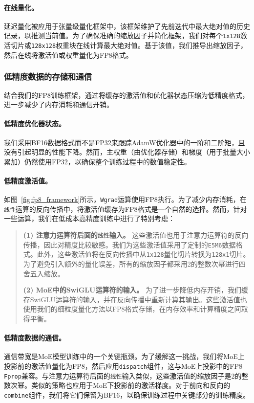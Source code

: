 \documentclass[lang=cn,a4paper,newtx]{elegantpaper}
\begin{document}
\paragraph{在线量化。}
延迟量化被应用于张量级量化框架中，该框架维护了先前迭代中最大绝对值的历史记录，以推测当前值。为了确保准确的缩放因子并简化框架，我们对每个\texttt{1x128}激活切片或\texttt{128x128}权重块在线计算最大绝对值。基于该值，我们推导出缩放因子，然后在线将激活值或权重量化为FP8格式。

\subsubsection{低精度数据的存储和通信}

结合我们的FP8训练框架，通过将缓存的激活值和优化器状态压缩为低精度格式，进一步减少了内存消耗和通信开销。

\paragraph{低精度优化器状态。}
我们采用BF16数据格式而不是FP32来跟踪AdamW优化器中的一阶和二阶矩，且没有引起明显的性能下降。然而，主权重（由优化器存储）和梯度（用于批量大小累加）仍然使用FP32，以确保整个训练过程中的数值稳定性。

\paragraph{低精度激活值。}
如图~\ref{fig:fp8_framework}所示，\texttt{Wgrad}运算使用FP8执行。为了减少内存消耗，在\texttt{线性}运算的反向传播中，将激活值缓存为FP8格式是一个自然的选择。然而，针对一些运算，我们在低成本高精度训练中进行了特别考虑：

\begin{quote}
\textbf{(1) 注意力运算符后面的\texttt{线性}输入。} 这些激活值也用于注意力运算符的反向传播，因此对精度比较敏感。我们为这些激活值采用了定制的\texttt{E5M6}数据格式。此外，这些激活值将在反向传播中从\texttt{1x128}量化切片转换为\texttt{128x1}切片。为了避免引入额外的量化误差，所有的缩放因子都采用2的整数次幂进行四舍五入缩放。

\textbf{(2) MoE中的SwiGLU运算符的输入。} 为了进一步降低内存开销，我们缓存SwiGLU运算符的输入，并在反向传播中重新计算其输出。这些激活值也使用我们的细粒度量化方法以FP8格式存储，在内存效率和计算精度之间取得平衡。
\end{quote}

\paragraph{低精度数据的通信。}
通信带宽是MoE模型训练中的一个关键瓶颈。为了缓解这一挑战，我们将MoE上投影前的激活值量化为FP8，然后应用\texttt{dispatch}组件，这与MoE上投影中的FP8 \texttt{Fprop}兼容。与注意力运算符后面的\texttt{线性}输入类似，这些激活值的缩放因子是2的整数次幂。类似的策略也应用于MoE下投影前的激活梯度。对于前向和反向的\texttt{combine}组件，我们将它们保留为BF16，以确保训练过程中关键部分的训练精度。
\end{document}
